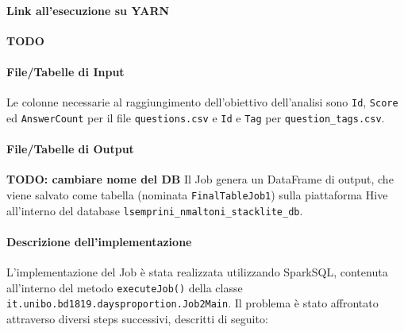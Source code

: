   \paragraph{Link all'esecuzione su YARN}\label{par:job2:spark:yarn}

  \textbf{TODO}

  \paragraph{File/Tabelle di Input}\label{par:job2:spark:input}

  Le colonne necessarie al raggiungimento dell'obiettivo dell'analisi sono \texttt{Id}, \texttt{Score}
  ed \texttt{AnswerCount} per il file \texttt{questions.csv} e \texttt{Id} e \texttt{Tag} per \texttt{question\_tags.csv}.

  \paragraph{File/Tabelle di Output}\label{par:job2:spark:output}
\textbf{TODO: cambiare nome del DB}
  Il Job genera un DataFrame di output, che viene salvato come tabella (nominata \texttt{FinalTableJob1})
  sulla piattaforma Hive all'interno del database \texttt{lsemprini\_nmaltoni\_stacklite\_db}.


  \paragraph{Descrizione dell'implementazione}\label{par:job2:spark:implementation}

  L'implementazione del Job è stata realizzata utilizzando SparkSQL, contenuta all'interno del metodo \texttt{executeJob()}
  della classe \texttt{it.unibo.bd1819.daysproportion.Job2Main}.
  Il problema è stato affrontato attraverso diversi steps successivi, descritti di seguito:

